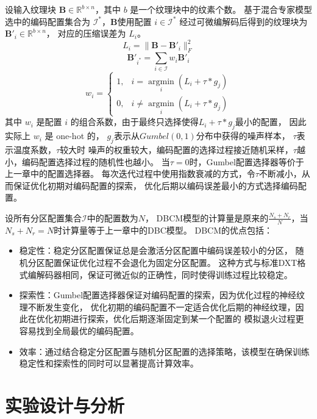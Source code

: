 设输入纹理块 $\mathbf{B}\in\mathbb{R}^{b\times n}$，其中 $b$ 是一个纹理块中的纹素个数。
基于混合专家模型选中的编码配置集合为 $\mathcal{I}^*$，$\mathbf{B}$使用配置 $i\in\mathcal{I}^*$ 
经过可微编解码后得到的纹理块为 $\mathbf{B}'_i\in\mathbb{R}^{b\times n}$，
对应的压缩误差为 $L_i$。
\begin{equation}
L_i=\|\mathbf{B}-\mathbf{B}'_i\|_F^2
\end{equation}
\begin{equation}
\mathbf{B}'_{i^*}=\sum_{i\in\mathcal{I}} w_i\mathbf{B}'_i
\end{equation}
\begin{equation}
    w_i =\left\{\begin{matrix}
        1,& i=\mathop{\arg\min}\limits_{i} (L_i+\tau*g_j)
        \\0,& i\ne\mathop{\arg\min}\limits_{i} (L_i+\tau*g_j)
        \end{matrix}\right.
\end{equation}
其中 $w_i$ 是配置 $i$ 的组合系数，由于最终只选择使得$L_i+\tau*g_j$最小的配置，
因此实际上 $w_i$ 是 one-hot 的，
$g_j$表示从$Gumbel(0,1)$分布中获得的噪声样本，
$\tau$表示温度系数，$\tau$较大时
噪声的权重较大，编码配置的选择过程接近随机采样，$\tau$越小，编码配置选择过程的随机性也越小。
当$\tau=0$时，Gumbel配置选择器等价于上一章中的配置选择器。
每次迭代过程中使用指数衰减的方式，令$\tau$不断减小，从而保证优化初期对编码配置的探索，
优化后期以编码误差最小的方式选择编码配置。

设所有分区配置集合$\mathcal{I}$中的配置数为$N$，
DBCM模型的计算量是原来的$\frac{N_s+N_r}{N}$，当$N_s+N_r=N$时计算量等于上一章中的DBC模型。
DBCM的优点包括：
\begin{itemize}
\item 稳定性：稳定分区配置保证总是会激活分区配置中编码误差较小的分区，
随机分区配置保证优化过程不会退化为固定分区配置。
这种方式与标准DXT格式编解码器相同，保证可微近似的正确性，同时使得训练过程比较稳定。
\item 探索性：Gumbel配置选择器保证对编码配置的探索，因为优化过程的神经纹理不断发生变化，
优化初期的编码配置不一定适合优化后期的神经纹理，因此在优化初期进行探索，优化后期逐渐固定到某一个配置的
模拟退火过程更容易找到全局最优的编码配置。
\item 效率：通过结合稳定分区配置与随机分区配置的选择策略，该模型在确保训练稳定性和探索性的同时可以显著提高计算效率。
\end{itemize}


\section{实验设计与分析}

